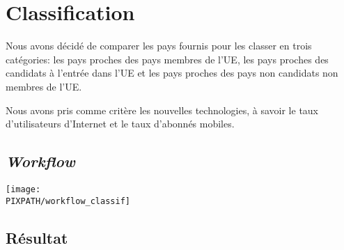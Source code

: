 \section{Classification}

Nous avons décidé de comparer les pays fournis pour
les classer en trois catégories: les pays proches des pays
membres de l'UE, les pays proches des candidats à l'entrée
dans l'UE et les pays proches des pays non candidats non
membres de l'UE.

Nous avons pris comme critère les nouvelles technologies, à savoir
le taux d'utilisateurs d'Internet et le taux d'abonnés mobiles.

\subsection{{\sl Workflow}}

\begin{sidewaysfigure}[h!]
\begin{center}

    \texttt{[image: \\PIXPATH/workflow\_classif]}

\end{center}
\end{sidewaysfigure}

\FloatBarrier

\subsection{Résultat}


